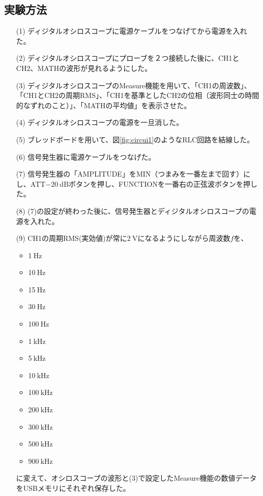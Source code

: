 \documentclass[10pt,a4paper]{jsarticle}
\numberwithin{equation}{section}
\numberwithin{figure}{section}
\numberwithin{table}{section}
\begin{document}
\subsection{実験方法}
\begin{itemize}
  \item [(1)]ディジタルオシロスコープに電源ケーブルをつなげてから電源を入れた。
  \item [(2)]ディジタルオシロスコープにプローブを２つ接続した後に、CH1とCH2、MATHの波形が見れるようにした。
  \item [(3)]ディジタルオシロスコープのMeasure機能を用いて、「CH1の周波数」、「CH1とCH2の周期RMS」、「CH1を基準としたCH2の位相（波形同士の時間的なずれのこと）」、「MATHの平均値」を表示させた。
  \item [(4)]ディジタルオシロスコープの電源を一旦消した。
  \item [(5)]ブレッドボードを用いて、図\ref{fig:circui1}のようなRLC回路を結線した。
  \item [(6)]信号発生器に電源ケーブルをつなげた。
  \item [(7)]信号発生器の「AMPLITUDE」をMIN（つまみを一番左まで回す）にし、ATT$\SI{-20}{\deci\bel}$ボタンを押し、FUNCTIONを一番右の正弦波ボタンを押した。
  \item [(8)](7)の設定が終わった後に、信号発生器とディジタルオシロスコープの電源を入れた。
  \item [(9)]CH1の周期RMS(実効値)が常に$\SI{2}{\volt}$になるようにしながら周波数$f$を、
  \begin{itemize}
    \item 1$\:\si{\hertz}$
    \item 10$\:\si{\hertz}$
    \item 15$\:\si{\hertz}$
    \item 30$\:\si{\hertz}$
    \item 100$\:\si{\hertz}$
    \item 1$\:\si{\kilo\hertz}$
    \item 5$\:\si{\kilo\hertz}$
    \item 10$\:\si{\kilo\hertz}$
    \item 100$\:\si{\kilo\hertz}$
    \item 200$\:\si{\kilo\hertz}$
    \item 300$\:\si{\kilo\hertz}$
    \item 500$\:\si{\kilo\hertz}$
    \item 900$\:\si{\kilo\hertz}$
  \end{itemize}
  に変えて、オシロスコープの波形と(3)で設定したMeasure機能の数値データをUSBメモリにそれぞれ保存した。
\end{itemize}
\end{document}
